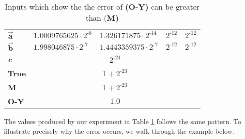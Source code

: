 \begin{table}
\centering
\small
\caption{\label{tab:markidi-v-ootomo}Inputs which show the the error of \citet{ootomo2022recovering} \textbf{(O-Y)} can be greater than \citet{markidis} (\textbf{M)}}
\begin{tabular}{|l|llll|}
\hline
$\vec{\textbf{a}}$ & $1.0009765625\cdot2^{\text{-}8}$ & $1.326171875\cdot2^{\text{-}14}$ & $2^{\text{-}12}$ & $2^{\text{-}12}$ \\
$\vec{\textbf{b}}$ & $1.998046875\cdot2^{\text{-}7}$ & $1.4443359375\cdot 2^{\text{-}7}$ &$2^{\text{-}12}$ & $2^{\text{-}12}$ \\
\textbf{\textit{c}} & \multicolumn{4}{c|}{$2^{\text{-}24}$} \\
\textbf{True} & \multicolumn{4}{c|}{$1 + 2^{\text{-}23}$} \\
\textbf{M} & \multicolumn{4}{c|}{$1 + 2^{\text{-}23}$} \\
\textbf{O-Y} & \multicolumn{4}{c|}{$1.0$} \\
\hline
\end{tabular}
\end{table}

The values produced by our experiment in Table \ref{tab:markidi-v-ootomo} follows the same pattern. To illustrate precisely why the error occurs, we walk through the example below.


